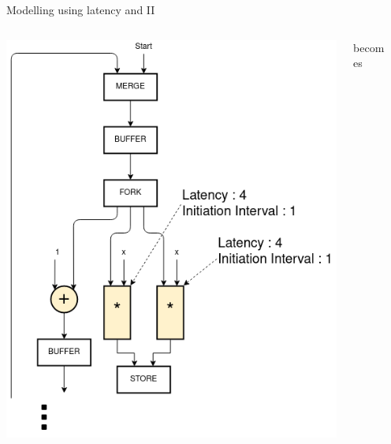 \documentclass{beamer}
\begin{document}
\begin{frame}{Modelling using latency and II}
      \begin{columns}[T]
    \begin{column}{0.25\textwidth}
        \begin{center}
      \includegraphics[scale=0.25]{latency_unshared.png}
    \end{center}
    \end{column}
    \begin{column}{0.1\textwidth}
    \begin{center}
        becomes
    \end{center}
    \end{column}
    \begin{column}{0.25\textwidth}
        \begin{center}

\end{center}
\end{column}
\end{columns}
\end{frame}
\end{document}
